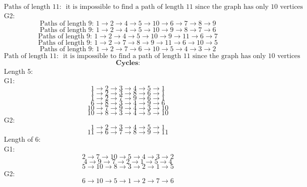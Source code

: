 \documentclass[a3paper,12pt]{extarticle} %
\begin{document}
\begin{enumerate}
\[    \]
    \[
        \text{Paths of length 11: } \text{ it is impossible to find a path of length 11 since the graph has only 10 vertices and we can only have a path of length 9 (n -1  )}
    \]
    G2:
    \[
        \text{Paths of length 9: } 1 \rightarrow 2 \rightarrow 4 \rightarrow 5 \rightarrow 10 \rightarrow 6 \rightarrow 7 \rightarrow 8 \rightarrow 9
    \]
    \[
        \text{Paths of length 9: } 1 \rightarrow 2 \rightarrow 4 \rightarrow 5 \rightarrow 10 \rightarrow 9 \rightarrow 8 \rightarrow 7 \rightarrow 6
    \]
    \[
        \text{Paths of length 9: } 1 \rightarrow 2 \rightarrow 4 \rightarrow 5 \rightarrow 10 \rightarrow 9 \rightarrow 11 \rightarrow 6 \rightarrow 7
    \]
    \[
        \text{Paths of length 9: } 1 \rightarrow 2 \rightarrow 7 \rightarrow 8 \rightarrow 9 \rightarrow 11 \rightarrow 6 \rightarrow 10 \rightarrow 5
    \]
    \[
        \text{Paths of length 9: } 1 \rightarrow 2 \rightarrow 7 \rightarrow 6 \rightarrow 10 \rightarrow 5 \rightarrow 4 \rightarrow 3 \rightarrow 2
    \]
    \[
        \text{Path of length 11: } \text{ it is impossible to find a path of length 11 since the graph has only 10 vertices and we can only have a path of length 9 (n -1  )}
    \]
    \[
    \textbf{Cycles:}
    \]
    Length 5:
    \\ G1:
    \[
        1 \rightarrow 2 \rightarrow 3 \rightarrow 4 \rightarrow 5 \rightarrow 1
    \]
    \[
        1 \rightarrow 2 \rightarrow 3 \rightarrow 8 \rightarrow 6 \rightarrow 1
    \]
    \[
        1 \rightarrow 2 \rightarrow 7 \rightarrow 9 \rightarrow 6 \rightarrow 1
    \]
    \[
        6 \rightarrow 8 \rightarrow 3 \rightarrow 4 \rightarrow 9 \rightarrow 6
    \]
    \[
        10 \rightarrow 7 \rightarrow 9 \rightarrow 4 \rightarrow 3 \rightarrow 10
    \]
    \[
        10 \rightarrow 8 \rightarrow 3 \rightarrow 4 \rightarrow 5 \rightarrow 10
    \]
    G2:
    \[
        1 \rightarrow 2 \rightarrow 3 \rightarrow 4 \rightarrow 5 \rightarrow 1    
    \]
    \[
        11 \rightarrow 6 \rightarrow 7 \rightarrow 8 \rightarrow 9 \rightarrow 11
    \]
    Length of 6:
    \\ G1:
    \[
        2 \rightarrow 7 \rightarrow 10 \rightarrow 5 \rightarrow 4 \rightarrow 3 \rightarrow 2
    \]
    \[
        4 \rightarrow 9 \rightarrow 7 \rightarrow 2 \rightarrow 1 \rightarrow 5 \rightarrow 4
    \]
    \[
        5 \rightarrow 10 \rightarrow 8 \rightarrow 3 \rightarrow 2 \rightarrow 1 \rightarrow 5
    \]
    G2:
    \[
        6 \rightarrow 10 \rightarrow 5 \rightarrow 1 \rightarrow 2 \rightarrow 7 \rightarrow 6
    \]
    \[
\]
\end{enumerate}
\end{document}
